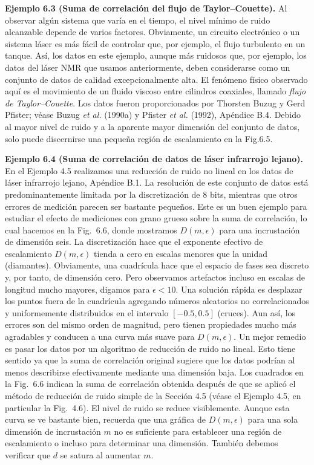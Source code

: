 \documentclass[10pt,a4paper]{book}
\begin{document}
\newpage

\textbf{Ejemplo 6.3 (Suma de correlación del flujo de Taylor–Couette).} Al observar algún sistema que varía en el tiempo, el nivel mínimo de ruido alcanzable depende de varios factores. Obviamente, un circuito electrónico o un sistema láser es más fácil de controlar que, por ejemplo, el flujo turbulento en un tanque. Así, los datos en este ejemplo, aunque más ruidosos que, por ejemplo, los datos del láser NMR que usamos anteriormente, deben considerarse como un conjunto de datos de calidad excepcionalmente alta. El fenómeno físico observado aquí es el movimiento de un fluido viscoso entre cilindros coaxiales, llamado \textit{flujo de Taylor–Couette}. Los datos fueron proporcionados por Thorsten Buzug y Gerd Pfister; véase Buzug \textit{et al.} (1990a) y Pfister \textit{et al.} (1992), Apéndice B.4. Debido al mayor nivel de ruido y a la aparente mayor dimensión del conjunto de datos, solo puede discernirse una pequeña región de escalamiento en la Fig.6.5. 

\bigskip

\textbf{Ejemplo 6.4 (Suma de correlación de datos de láser infrarrojo lejano).} En el Ejemplo 4.5 realizamos una reducción de ruido no lineal en los datos de láser infrarrojo lejano, Apéndice B.1. La resolución de este conjunto de datos está predominantemente limitada por la discretización de 8 bits, mientras que otros errores de medición parecen ser bastante pequeños. Este es un buen ejemplo para estudiar el efecto de mediciones con grano grueso sobre la suma de correlación, lo cual hacemos en la Fig.~6.6, donde mostramos $D(m, \epsilon)$ para una incrustación de dimensión seis. La discretización hace que el exponente efectivo de escalamiento $D(m, \epsilon)$ tienda a cero en escalas menores que la unidad (diamantes). Obviamente, una cuadrícula hace que el espacio de fases sea discreto y, por tanto, de dimensión cero. Pero observamos artefactos incluso en escalas de longitud mucho mayores, digamos para $\epsilon < 10$. Una solución rápida es desplazar los puntos fuera de la cuadrícula agregando números aleatorios no correlacionados y uniformemente distribuidos en el intervalo $[-0.5, 0.5]$ (cruces). Aun así, los errores son del mismo orden de magnitud, pero tienen propiedades mucho más agradables y conducen a una curva más suave para $D(m, \epsilon)$. Un mejor remedio es pasar los datos por un algoritmo de reducción de ruido no lineal. Esto tiene sentido ya que la suma de correlación original sugiere que los datos podrían al menos describirse efectivamente mediante una dimensión baja. Los cuadrados en la Fig.~6.6 indican la suma de correlación obtenida después de que se aplicó el método de reducción de ruido simple de la Sección 4.5 (véase el Ejemplo 4.5, en particular la Fig.~4.6). El nivel de ruido se reduce visiblemente. Aunque esta curva se ve bastante bien, recuerda que una gráfica de $D(m, \epsilon)$ para una sola dimensión de incrustación $m$ no es suficiente para establecer una región de escalamiento o incluso para determinar una dimensión. También debemos verificar que $d$ se satura al aumentar $m$. 
\end{document}
